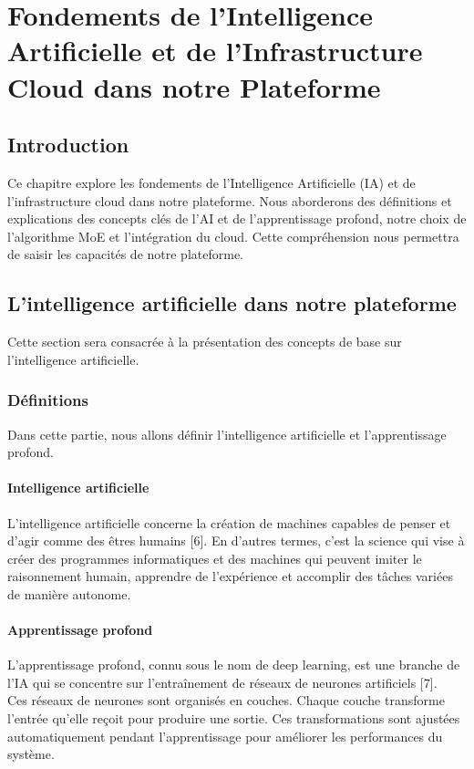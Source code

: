 \vfill 
\chapter{Fondements de l'Intelligence Artificielle et de l'Infrastructure Cloud dans notre Plateforme}
\label{chap:fondements de l'Intelligence Artificielle et de l'Infrastructure Cloud dans notre Plateforme}
\vfill 
\minitoc
\mtcaddchapter
\vfill 

\newpage

\section*{Introduction}
\justifying
Ce chapitre explore les fondements de l'Intelligence Artificielle (IA) et de l'infrastructure cloud dans notre plateforme. Nous aborderons des définitions et explications des concepts clés de l’AI et de l’apprentissage profond, notre choix de l'algorithme MoE et l'intégration du cloud. Cette compréhension nous permettra de saisir les capacités de notre plateforme.

\section{L'intelligence artificielle dans notre plateforme}
\justifying
Cette section sera consacrée à la présentation des concepts de base sur 
l’intelligence artificielle.
\subsection{Définitions}
\justifying
Dans cette partie, nous allons définir l'intelligence artificielle et l'apprentissage profond.


\subsubsection{Intelligence artificielle}
\justifying
L'intelligence artificielle concerne la création de machines capables de penser et d'agir comme des êtres humains [6]. En d'autres termes, c'est la science qui vise à créer des programmes informatiques et des machines qui peuvent imiter le raisonnement humain, apprendre de l'expérience et accomplir des tâches variées de manière autonome.

\subsubsection{Apprentissage profond}
\justifying
L'apprentissage profond, connu sous le nom de deep learning, est une branche de l’IA qui se concentre sur l'entraînement de réseaux de neurones artificiels [7].\\
Ces réseaux de neurones sont organisés en couches. Chaque couche transforme l'entrée qu'elle reçoit pour produire une sortie. Ces transformations sont ajustées automatiquement pendant l'apprentissage pour améliorer les performances du système.

